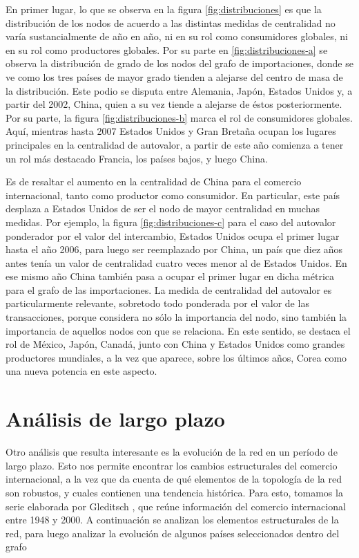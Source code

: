 \documentclass[a4paper]{article}
\begin{document}
En primer lugar, lo que se observa en la figura \ref{fig:distribuciones} es que la distribución de los nodos de acuerdo a las distintas medidas de centralidad no varía sustancialmente de año en año, ni en su rol como consumidores globales, ni en su rol como productores globales. Por su parte en \ref{fig:distribuciones-a} se observa la distribución de grado de los nodos del grafo de importaciones, donde se ve como los tres países de mayor grado tienden a alejarse del centro de masa de la distribución. Este podio se disputa entre Alemania, Japón, Estados Unidos y, a partir del 2002, China, quien a su vez tiende a alejarse de éstos posteriormente. Por su parte, la figura \ref{fig:distribuciones-b} marca el rol de consumidores globales. Aquí, mientras hasta 2007 Estados Unidos y Gran Bretaña ocupan los lugares principales en la centralidad de autovalor, a partir de este año comienza a tener un rol más destacado Francia, los países bajos, y luego China.      

Es de resaltar el aumento en la centralidad de China para el comercio internacional, tanto como productor como consumidor. En particular, este país desplaza a Estados Unidos de ser el nodo de mayor centralidad en muchas medidas. Por ejemplo, la figura \ref{fig:distribuciones-c} para el caso del autovalor ponderador por el valor del intercambio, Estados Unidos ocupa el primer lugar hasta el año 2006, para luego ser reemplazado por China, un país que diez años antes tenía un valor de centralidad cuatro veces menor al de Estados Unidos. En ese mismo año China también pasa a ocupar el primer lugar en dicha métrica para el grafo de las importaciones. La medida de centralidad del autovalor es particularmente relevante, sobretodo todo ponderada por el valor de las transacciones, porque considera no sólo la importancia del nodo, sino también la importancia de aquellos nodos con que se relaciona. En este sentido, se destaca el rol de México, Japón, Canadá, junto con China y Estados Unidos como grandes productores mundiales, a la vez que aparece, sobre los últimos años, Corea como una nueva potencia en este aspecto.  

\section{Análisis de largo plazo}

Otro análisis que resulta interesante es la evolución de la red en un período de largo plazo. Esto nos permite encontrar los cambios estructurales del comercio internacional, a la vez que da cuenta de qué elementos de la topología de la red son robustos, y cuales contienen una tendencia histórica. 
Para esto, tomamos la serie elaborada por Gleditsch \cite{Gleditsch2002}, que reúne información del comercio internacional entre 1948 y 2000. 
A continuación se analizan los elementos estructurales de la red, para luego analizar la evolución de algunos países seleccionados dentro del grafo
\end{document}
